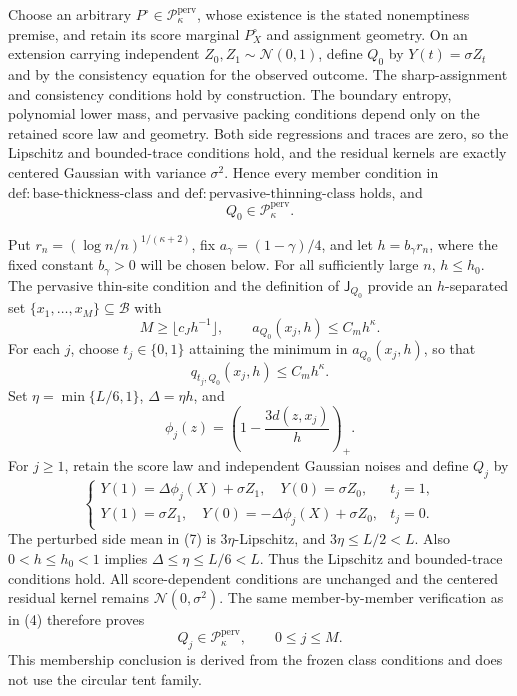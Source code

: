 Choose an arbitrary \(P^\circ\in\mathcal P_{\kappa}^{\mathrm{perv}}\), whose existence is the stated nonemptiness premise, and retain its score marginal \(P_X^\circ\) and assignment geometry. On an extension carrying independent \(Z_0,Z_1\sim\mathcal N(0,1)\), define \(Q_0\) by \(Y(t)=\sigma Z_t\) and by the consistency equation for the observed outcome. The sharp-assignment and consistency conditions hold by construction. The boundary entropy, polynomial lower mass, and pervasive packing conditions depend only on the retained score law and geometry. Both side regressions and traces are zero, so the Lipschitz and bounded-trace conditions hold, and the residual kernels are exactly centered Gaussian with variance \(\sigma^2\). Hence every member condition in \(\mathrm{def:base\text{-}thickness\text{-}class}\) and \(\mathrm{def:pervasive\text{-}thinning\text{-}class}\) holds, and
\[
 Q_0\in\mathcal P_{\kappa}^{\mathrm{perv}}. \tag{4}
\]

Put \(r_n=(\log n/n)^{1/(\kappa+2)}\), fix \(a_\gamma=(1-\gamma)/4\), and let \(h=b_\gamma r_n\), where the fixed constant \(b_\gamma>0\) will be chosen below. For all sufficiently large \(n\), \(h\le h_0\). The pervasive thin-site condition and the definition of \(\mathsf J_{Q_0}\) provide an \(h\)-separated set \(\{x_1,\ldots,x_M\}\subseteq\mathcal B\) with
\[
 M\ge\lfloor c_Jh^{-1}\rfloor,
 \qquad
 a_{Q_0}(x_j,h)\le C_mh^\kappa. \tag{5}
\]
For each \(j\), choose \(t_j\in\{0,1\}\) attaining the minimum in \(a_{Q_0}(x_j,h)\), so that
\[
 q_{t_j,Q_0}(x_j,h)\le C_mh^\kappa. \tag{6}
\]
Set \(\eta=\min\{L/6,1\}\), \(\Delta=\eta h\), and
\[
 \phi_j(z)=\left(1-\frac{3d(z,x_j)}h\right)_+.
\]
For \(j\ge1\), retain the score law and independent Gaussian noises and define \(Q_j\) by
\[
 \begin{cases}
 Y(1)=\Delta\phi_j(X)+\sigma Z_1,\quad Y(0)=\sigma Z_0,&t_j=1,\\
 Y(1)=\sigma Z_1,\quad Y(0)=-\Delta\phi_j(X)+\sigma Z_0,&t_j=0.
 \end{cases} \tag{7}
\]
The perturbed side mean in (7) is \(3\eta\)-Lipschitz, and \(3\eta\le L/2<L\). Also \(0<h\le h_0<1\) implies \(\Delta\le\eta\le L/6<L\). Thus the Lipschitz and bounded-trace conditions hold. All score-dependent conditions are unchanged and the centered residual kernel remains \(\mathcal N(0,\sigma^2)\). The same member-by-member verification as in (4) therefore proves
\[
 Q_j\in\mathcal P_{\kappa}^{\mathrm{perv}},\qquad 0\le j\le M. \tag{8}
\]
This membership conclusion is derived from the frozen class conditions and does not use the circular tent family.

